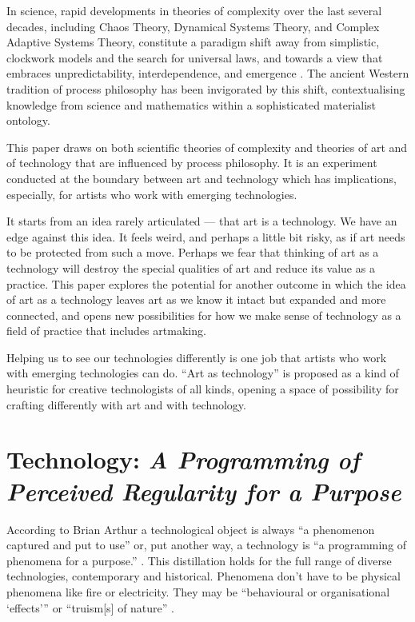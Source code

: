 \documentclass[letterpaper]{article}
\begin{document}
    In science, rapid developments in theories of complexity over the last several decades, including Chaos Theory, Dynamical Systems Theory, and Complex Adaptive Systems Theory, constitute a paradigm shift away from simplistic, clockwork models and the search for universal laws, and towards a view that embraces unpredictability, interdependence, and emergence \citep{StengersOrdrOtOfChs1984}. The ancient Western tradition of process philosophy \citep{SeibtStnfrdEncyclpdPrcssPhlsphy1974} has been invigorated by this shift, contextualising knowledge from science and mathematics within a sophisticated materialist ontology.
    
    This paper draws on both scientific theories of complexity and theories of art and of technology that are influenced by process philosophy. It is an experiment conducted at the boundary between art and technology which has implications, especially, for artists who work with emerging technologies.
    
    It starts from an idea rarely articulated \citep[pp.74-75]{SauvagnarguesArtmchns2016} — that art is a technology. We have an edge against this idea. It feels weird, and perhaps a little bit risky, as if art needs to be protected from such a move. Perhaps we fear that thinking of art as a technology will destroy the special qualities of art and reduce its value as a practice. This paper explores the potential for another outcome in which the idea of art as a technology leaves art as we know it intact but expanded and more connected, and opens new possibilities for how we make sense of technology as a field of practice that includes artmaking. 
    
    Helping us to see our technologies differently is one job that artists who work with emerging technologies can do. “Art as technology” is proposed as a kind of heuristic for creative technologists of all kinds, opening a space of possibility for crafting differently with art and with technology.

\section{Technology: \emph{A Programming of Perceived Regularity for a Purpose}} 

    According to Brian Arthur a technological object is always “a phenomenon captured and put to use” \citep[p.53]{theNatureOfTechnology2009} or, put another way, a technology is “a programming of phenomena for a purpose.” \citep[p.53]{theNatureOfTechnology2009}. This distillation holds for the full range of diverse technologies, contemporary and historical. Phenomena don't have to be physical phenomena like fire or electricity. They may be “behavioural or organisational ‘effects’” \citep[p.55]{theNatureOfTechnology2009} or “truism[s] of nature” \citep[p.45]{theNatureOfTechnology2009}.
\end{document}
